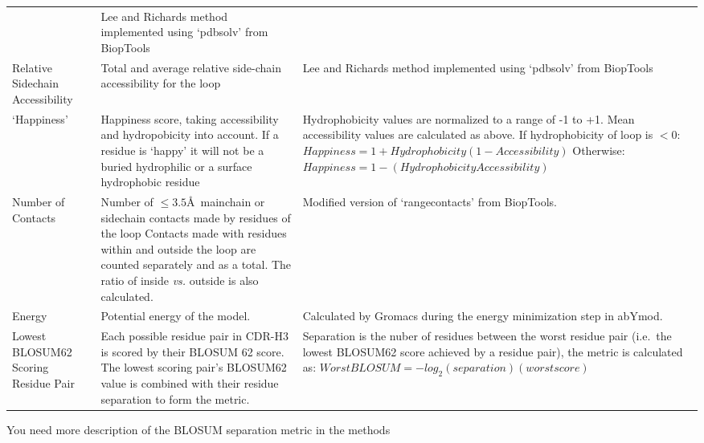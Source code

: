 \documentclass[12pt]{article}
\newcommand{\lilian}[1]{ {\color{red}{\bfseries Lilian:} #1}}
\begin{document}
\begin{landscape}
\begin{longtable}{p{3cm}p{10cm}p{10cm}}
  & Lee and Richards method implemented using `pdbsolv' from BiopTools\\
%  
  \mbox{Relative} \mbox{Sidechain} \mbox{Accessibility} %
  & Total and average relative side-chain accessibility for the loop %
  & Lee and Richards method implemented using `pdbsolv' from BiopTools\\
%  
  `Happiness' %
  & Happiness score, taking accessibility and hydropobicity into account. If a residue is `happy' it will not be a buried hydrophilic or a surface hydrophobic residue %
  & Hydrophobicity values are normalized to a range of -1 to +1. Mean accessibility values are calculated as above. If hydrophobicity of loop is $<0$:
  $Happiness = 1+Hydrophobicity(1-Accessibility)$
  Otherwise:
  $Happiness = 1-(Hydrophobicity Accessibility)$\\
%  
  \mbox{Number} \mbox{of} \mbox{Contacts} %
  & Number of $\le 3.5$\AA\ mainchain or sidechain contacts made by residues of the loop %
    Contacts made with residues within and outside the loop are counted separately and as a total. The ratio of inside \emph{vs.} outside is also calculated. %
  & Modified version of `rangecontacts' from BiopTools. \\
%  
  Energy %
  & Potential energy of the model. %
  & Calculated by Gromacs during the energy minimization step in abYmod. \\
%
  \mbox{Lowest} \mbox{BLOSUM62} \mbox{Scoring} \mbox{Residue} \mbox{Pair} %
  & Each possible residue pair in CDR-H3 is scored by their BLOSUM 62 score. %
    The lowest scoring pair's BLOSUM62 value is combined with their residue separation to form the metric. %
  & Separation is the nuber of residues between the worst residue pair (i.e.\ the lowest BLOSUM62 score achieved by a residue pair), %
    the metric is calculated as: $WorstBLOSUM = -log_2(separation)(worst score)$\\ \hline
  \end{longtable}
  \lilian{You need more description of the BLOSUM separation metric in the methods}
\end{landscape}
\end{document}

